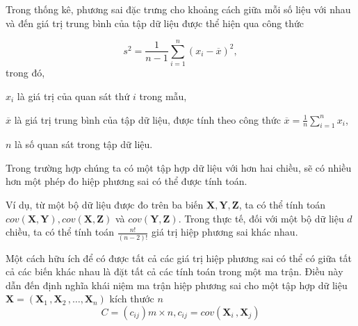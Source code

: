 \documentclass[../thesis.tex]{subfiles}
\begin{document}

Trong thống kê, phương sai đặc trưng cho khoảng cách giữa mỗi số liệu với nhau và đến giá trị trung bình của tập dữ liệu được thể hiện qua công thức

$$ s^2 = \dfrac{1}{n-1}\sum_{i=1}^{n}(x_i-\overline{x})^2, $$
trong đó, 

$ x_i $ là giá trị của quan sát thứ $ i $ trong mẫu,

$ \overline{x} $ là giá trị trung bình của tập dữ liệu, được tính theo công thức $ \overline{x} = \frac{1}{n}\sum^{n}_{i=1} x_i $,

$ n $ là số quan sát trong tập dữ liệu.


Trong trường hợp chúng ta có một tập hợp dữ liệu với hơn hai chiều, sẽ có nhiều hơn một phép đo hiệp phương sai có thể được tính toán. 

Ví dụ, từ một bộ dữ liệu được đo trên ba biến $ \mathbf{X}, \mathbf{Y}, \mathbf{Z} $, ta có thể tính toán $ cov(\mathbf{X}, \mathbf{Y}), cov(\mathbf{X}, \mathbf{Z}) $ và $ cov(\mathbf{Y}, \mathbf{Z}) $. Trong thực tế, đối với một bộ dữ liệu $ d $ chiều, ta có thể tính toán $ \frac{n!}{(n-2)!} $ giá trị hiệp phương sai khác nhau. 

Một cách hữu ích để có được tất cả các giá trị hiệp phương sai có thể có giữa tất cả các biến khác nhau là đặt tất cả các tính toán trong một ma trận. Điều này dẫn đến định nghĩa khái niệm ma trận hiệp phương sai cho một tập hợp dữ liệu $ \mathbf{X} = (\mathbf{X}_1\,, \mathbf{X}_2\,, \ldots, \mathbf{X}_n) $ kích thước $ n $
$$ C=(c_{ij}){m\times n}, c_{ij}=cov(\mathbf{X}_i\,,\mathbf{X}_j) $$







\end{document}
